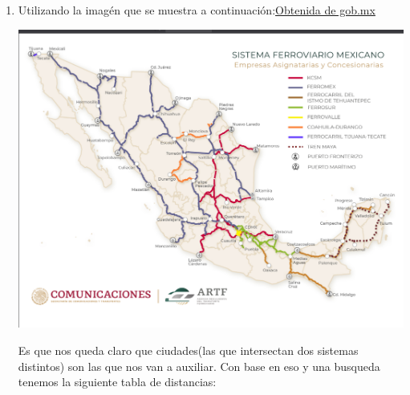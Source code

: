 \documentclass[14pt,letterpaper]{article}
\begin{document}
\begin{enumerate}
      \begin{enumerate}
      \item Utilizando la imagén que se muestra a continuación:\href{https://www.gob.mx/cms/uploads/attachment/file/559748/SFM_2020_ESQUEMATICO_.pdf}{Obtenida de gob.mx}

      \begin{centering}
        \includegraphics[scale=.3]{ferroviario}
      \end{centering}

      Es que nos queda claro que ciudades(las que intersectan dos sistemas distintos) son las
      que nos van a auxiliar. Con base en eso y una busqueda tenemos la siguiente tabla
      de distancias:


\end{enumerate}
\end{enumerate}
\end{document}
